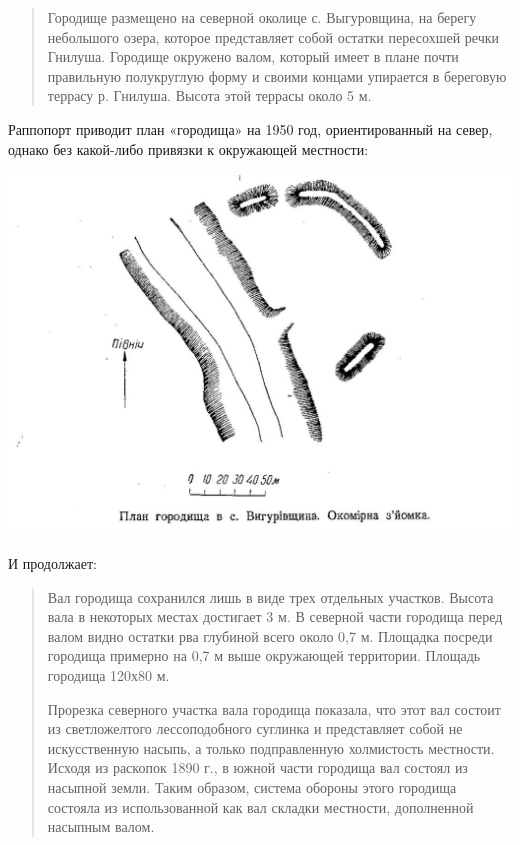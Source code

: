 \begin{quotation}
Городище размещено на северной околице с. Выгуровщина, на берегу небольшого озера, которое представляет собой остатки пересохшей речки Гнилуша. Городище окружено валом, который имеет в плане почти правильную полукруглую форму и своими концами упирается в береговую террасу р. Гнилуша. Высота этой террасы около 5 м.
\end{quotation}

Раппопорт приводит план «городища» на 1950 год, ориентированный на север, однако без какой-либо привязки к окружающей местности:

\begin{center}
\includegraphics[width=\linewidth]{chast-gorodki/radunka/rapp.jpg}
\end{center}

И продолжает:

\begin{quotation}
Вал городища сохранился лишь в виде трех отдельных участков. Высота вала в некоторых местах достигает 3 м. В северной части городища перед валом видно остатки рва глубиной всего около 0,7 м. Площадка посреди городища примерно на 0,7 м выше окружающей территории. Площадь городища 120х80 м.

Прорезка северного участка вала городища показала, что этот вал состоит из светложелтого лессоподобного суглинка и представляет собой не искусственную насыпь, а только подправленную холмистость местности. Исходя из раскопок 1890 г., в южной части городища вал состоял из насыпной земли. Таким образом, система обороны этого городища состояла из использованной как вал складки местности, дополненной насыпным валом.
\end{quotation}

